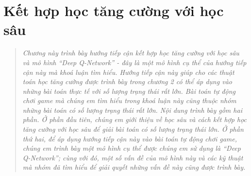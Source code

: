 %

\chapter{Kết hợp học tăng cường với học sâu}
\ifpdf
\graphicspath{{Chapter3/Chapter3Figs/PNG/}{Chapter3/Chapter3Figs/PDF/}{Chapter3/Chapter3Figs/}}
\else
\graphicspath{{Chapter3/Chapter3Figs/EPS/}{Chapter3/Chapter3Figs/}}
\fi
\begin{quote}
\textit{Chương này trình bày hướng tiếp cận kết hợp học tăng cường với học sâu và mô hình ``Deep Q-Network'' \cite{mnihdqn2015} - đây là một mô hình cụ thể của hướng tiếp cận này mà khoá luận tìm hiểu.
Hướng tiếp cận này giúp cho các thuật toán học tăng cường được trình bày trong chương 2 có thể áp dụng vào những bài toán thực tế với số lượng trạng thái rất lớn.
Bài toán tự động chơi game mà chúng em tìm hiểu trong khoá luận này cũng thuộc nhóm những bài toán có số lượng trạng thái rất lớn.
Nội dung trình bày gồm hai phần.
Ở phần đầu tiên, chúng em giới thiệu về học sâu và cách kết hợp học tăng cường với học sâu để giải bài toán có số lượng trạng thái lớn.
Ở phần thứ hai, để áp dụng hướng tiếp cận này vào bài toán tự động chơi game, chúng em trình bày một mô hình cụ thể được chúng em sử dụng là ``Deep Q-Network''; cùng với đó, một số vấn đề của mô hình này và các kỹ thuật mà nhóm đã tìm hiểu để giải quyết những vấn đề này cũng được trình bày.}
\end{quote}

